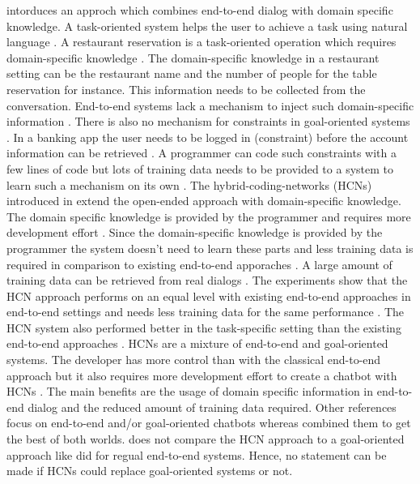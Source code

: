 \citet{williams2017hybrid} intorduces an approch which combines end-to-end dialog with domain specific knowledge.
A task-oriented system helps the user to achieve a task using natural language \cite{williams2017hybrid}.
A restaurant reservation is a task-oriented operation which requires domain-specific knowledge \cite{williams2017hybrid}.
The domain-specific knowledge in a restaurant setting can be the restaurant name and the number of people for 
the table reservation for instance. 
This information needs to be collected from the conversation.
End-to-end systems lack a mechanism to inject such domain-specific information \cite{williams2017hybrid}.
There is also no mechanism for constraints in goal-oriented systems \cite{williams2017hybrid}.
In a banking app the user needs to be logged in (constraint) before the account information can be retrieved \cite{williams2017hybrid}.
A programmer can code such constraints with a few lines of code but lots of training data needs to be provided 
to a system to learn such a mechanism on its own \cite{williams2017hybrid}.
The hybrid-coding-networks (HCNs) introduced in \citet{williams2017hybrid} extend the open-ended approach 
with domain-specific knowledge. 
The domain specific knowledge is provided by the programmer and requires more development effort \cite{williams2017hybrid}.
Since the domain-specific knowledge is provided by the programmer the system doesn't need to learn 
these parts and less training data is required in comparison to existing end-to-end apporaches \cite{williams2017hybrid}.
A large amount of training data can be retrieved from real dialogs \cite{williams2017hybrid}.
The experiments show that the HCN approach performs on an equal level with 
existing end-to-end approaches in end-to-end settings and needs less training data for 
the same performance \cite{williams2017hybrid}. 
The HCN system also performed better in the task-specific setting than the existing end-to-end approaches \cite{williams2017hybrid}.
HCNs are a mixture of end-to-end and goal-oriented systems.
The developer has more control than with the classical end-to-end approach but 
it also requires more development effort to create a chatbot with HCNs \cite{williams2017hybrid}.
The main benefits are the usage of domain specific information in end-to-end dialog 
and the reduced amount of training data required.
Other references focus on end-to-end and/or goal-oriented chatbots whereas \citet{williams2017hybrid} combined them 
to get the best of both worlds.
\citet{williams2017hybrid} does not compare the HCN approach to a goal-oriented approach like \citet{bordes2016learning} did
for regual end-to-end systems.
Hence, no statement can be made if HCNs could replace goal-oriented systems or not.

